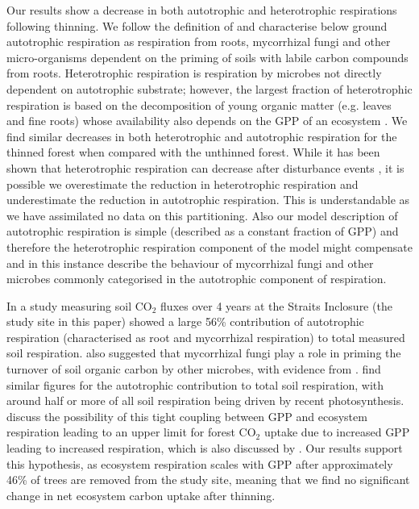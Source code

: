 \documentclass[draft,linenumbers]{agujournal}
\begin{document}
Our results show a decrease in both autotrophic and heterotrophic respirations following thinning. We follow the definition of \citet{heinemeyer2012exploring} and characterise below ground autotrophic respiration as respiration from roots, mycorrhizal fungi and other micro-organisms dependent on the priming of soils with labile carbon compounds from roots. Heterotrophic respiration is respiration by microbes not directly dependent on autotrophic substrate; however, the largest fraction of heterotrophic respiration is based on the decomposition of young organic matter (e.g. leaves and fine roots) whose availability also depends on the GPP of an ecosystem \citep{GCB:GCB412}. We find similar decreases in both heterotrophic and autotrophic respiration for the thinned forest when compared with the unthinned forest. While it has been shown that heterotrophic respiration can decrease after disturbance events \citep{PCE:PCE1053}, it is possible we overestimate the reduction in heterotrophic respiration and underestimate the reduction in autotrophic respiration. This is understandable as we have assimilated no data on this partitioning. Also our model description of autotrophic respiration is simple (described as a constant fraction of GPP) and therefore the heterotrophic respiration component of the model might compensate and in this instance describe the behaviour of mycorrhizal fungi and other microbes commonly categorised in the autotrophic component of respiration.   

In a study measuring soil CO\(_{2}\) fluxes over 4 years at the Straits Inclosure (the study site in this paper) \citet{heinemeyer2012exploring} showed a large 56\% contribution of autotrophic respiration (characterised as root and mycorrhizal respiration) to total measured soil respiration. \citet{heinemeyer2012exploring} also suggested that mycorrhizal fungi play a role in priming the turnover of soil organic carbon by other microbes, with evidence from \citet{talbot2008decomposers}. \citet{hogberg2006towards} find similar figures for the autotrophic contribution to total soil respiration, with around half or more of all soil respiration being driven by recent photosynthesis. \citet{heinemeyer2012exploring} discuss the possibility of this tight coupling between GPP and ecosystem respiration leading to an upper limit for forest CO\(_{2}\) uptake due to increased GPP leading to increased respiration, which is also discussed by \citet{heath2005rising}. Our results support this hypothesis, as ecosystem respiration scales with GPP after approximately 46\% of trees are removed from the study site, meaning that we find no significant change in net ecosystem carbon uptake after thinning.   
\end{document}
